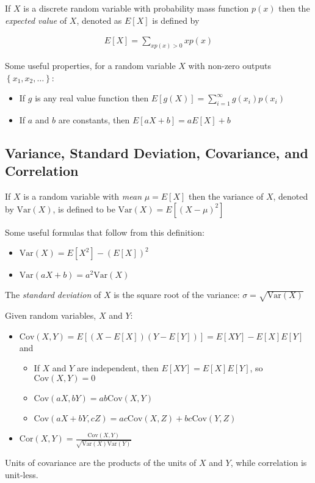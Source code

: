 \documentclass[10pt]{article}
\begin{document}
		If $X$ is a discrete random variable with probability mass function $p(x)$ then the \emph{expected value} of $X$, denoted as $E[X]$ is defined by
		
		\begin{align*}
			E[X] = \sum_{xp(x)>0}xp(x)
		\end{align*}
		
		Some useful properties, for a random variable $X$ with non-zero outputs $\left\{ x_1, x_2, \ldots \right\}$: 
		
		\begin{itemize}
			\item If $g$ is any real value function then $E[g(X)] =  \sum_{i=1}^{\infty}g(x_i)p(x_i)$
			\item If $a$ and $b$ are constants, then $E[aX+b] = aE[X] + b $
		\end{itemize}
		
		\subsection*{Variance, Standard Deviation, Covariance, and Correlation}
		
		If $X$ is a random variable with \emph{mean} $\mu=E[X]$ then the variance of $X$, denoted by $\text{Var}(X)$, is defined to be $\text{Var}(X) = E[(X-\mu)^2]$
		
		Some useful formulas that follow from this definition:
		\begin{multicols}{2}
			\begin{itemize}
				\item $\text{Var}(X) = E[X^2] - (E[X])^2$
				\item $\text{Var}(aX + b) = a^2 \text{Var}(X)$
			\end{itemize}
		\end{multicols}
		
		The \emph{standard deviation} of $X$ is the square root of the variance: $\sigma = \sqrt{\text{Var}(X)}$
		
		Given random variables, $X$ and $Y$:
		\begin{itemize}
			\item $\text{Cov}(X,Y)=E[(X-E[X])(Y-E[Y])]=E[XY]-E[X]E[Y]$ and
			\begin{itemize}
				\item If $X$ and $Y$ are independent, then $E[XY]=E[X]E[Y]$, so $\text{Cov}(X,Y) = 0$
				\item $\text{Cov}(aX,bY)=ab\text{Cov}(X,Y)$
				\item $\text{Cov}(aX+bY,cZ)=ac\text{Cov}(X,Z) + bc\text{Cov}(Y,Z)$
			\end{itemize}
			\item $\text{Cor}(X,Y) =\frac{ \text{Cov}(X,Y)}{\sqrt{\text{Var}(X)\text{Var}(Y)}}$
		\end{itemize} 
		Units of covariance are the products of the units of $X$ and $Y$, while correlation is unit-less.
		
\end{document}
